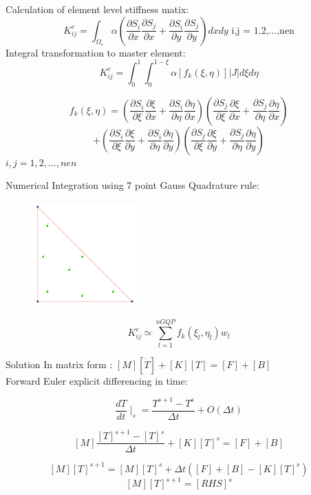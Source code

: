 \documentclass[t,english]{beamer}
\begin{document}
\begin{frame}
Calculation of element level stiffness matix:
$$K_{ij}^e = \int_{\Omega_e} \alpha (\frac{\partial S_i}{\partial x}\frac{\partial S_j}{\partial x} + \frac{\partial S_i}{\partial y}\frac{\partial S_j}{\partial y})dx dy \text{     i,j = 1,2,...,nen}$$
Integral transformation to master element:
$$K_{ij}^e = \int_{0}^1 \int_0^{1-\xi} \alpha [f_k(\xi,\eta)]|J|d\xi d\eta$$

$$ f_k(\xi,\eta) = \left(\frac{\partial S_i}{\partial \xi}\frac{\partial \xi}{\partial x} + \frac{\partial S_i}{\partial \eta}\frac{\partial \eta}{\partial x}\right)\left(\frac{\partial S_j}{\partial \xi}\frac{\partial \xi}{\partial x} + \frac{\partial S_j}{\partial \eta}\frac{\partial \eta}{\partial x}\right)$$
$$+ \left(\frac{\partial S_i}{\partial \xi}\frac{\partial \xi}{\partial y} + \frac{\partial S_i}{\partial \eta}\frac{\partial \eta}{\partial y}\right)\left(\frac{\partial S_j}{\partial \xi}\frac{\partial \xi}{\partial y} + \frac{\partial S_j}{\partial \eta}\frac{\partial \eta}{\partial y}\right)$$
$i,j = 1,2,...,nen$
\end{frame}

\begin{frame}
Numerical Integration using 7 point Gauss Quadrature rule:
\begin{figure}[ht!]
\centering
\includegraphics[width=40mm]{GQP7.png}
\end{figure}
$$K_{ij}^e \simeq \sum_{l=1}^{nGQP}f_k(\xi_l,\eta_l) w_l$$
\end{frame}

\begin{frame}[c]{Solution}
In matrix form :
$[M][\dot{T}]+[K][T]=[F]+[B]$
\\
Forward Euler explicit differencing in time:

$$ \frac{dT}{dt } \mid_s = \frac{T^{s+1}-T^s}{ \Delta t} +O( \Delta t)$$

$$[M]  \frac{[T]^{s+1}-[T]^s}{ \Delta t} +[K][T]^s=[F]+[B]$$

$$[M] [T]^{s+1}=[M][T]^s+{ \Delta t} ([F]+[B]-[K][T]^s)$$
$$[M] [T]^{s+1}=[RHS]^s$$

\end{frame}
\end{document}
